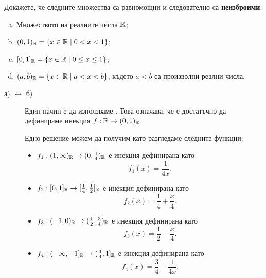 \begin{problem}
  Докажете, че следните множества са равномощни и следователно са {\bf неизброими}.
  \begin{enumerate}[a)]
  \item
    Множеството на реалните числа $\mathbb{R}$;
  \item
    $(0,1)_{\mathbb{R}} = \{x \in \mathbb{R} \mid 0 < x < 1\}$;
  \item
    $[0,1]_{\mathbb{R}} = \{x \in \mathbb{R} \mid 0 \leq x \leq 1\}$;
  \item
    $(a,b)_{\mathbb{R}} = \{x \in \mathbb{R} \mid a < x < b\}$, където $a<b$ са произволни реални числа.
  \end{enumerate}
\end{problem}
\begin{hint}
  \begin{description}
  \item[а) $\leftrightarrow$ б)]
    Един начин е да използваме . Това означава, че е достатъчно да дефинираме инекция $f:\mathbb{R} \to (0,1)_{\mathbb{R}}$.

    Едно решение можем да получим като разгледаме следните функции:
    \begin{itemize}
    \item 
      $f_1: (1,\infty)_{\mathbb{R}} \to (0,\frac{1}{4})_{\mathbb{R}}$ е инекция дефинирана като
      \[f_1(x) = \frac{1}{4x}.\]
    \item
      $f_2: [0,1]_{\mathbb{R}} \to [\frac{1}{4},\frac{1}{2}]_{\mathbb{R}}$ е инекция дефинирана като
      \[f_2(x) = \frac{1}{4} + \frac{x}{4}.\]
    \item
      $f_3: (-1,0)_{\mathbb{R}} \to (\frac{1}{2},\frac{3}{4})_{\mathbb{R}}$ е инекция дефинирана като
      \[f_3(x) = \frac{1}{2} - \frac{x}{4}.\]
    \item
      $f_4: (-\infty,-1]_{\mathbb{R}} \to (\frac{3}{4},1]_{\mathbb{R}}$ е инекция дефинирана като
      \[f_4(x) = \frac{3}{4} - \frac{1}{4x}.\]
    \end{itemize}


\end{description}
\end{hint}
